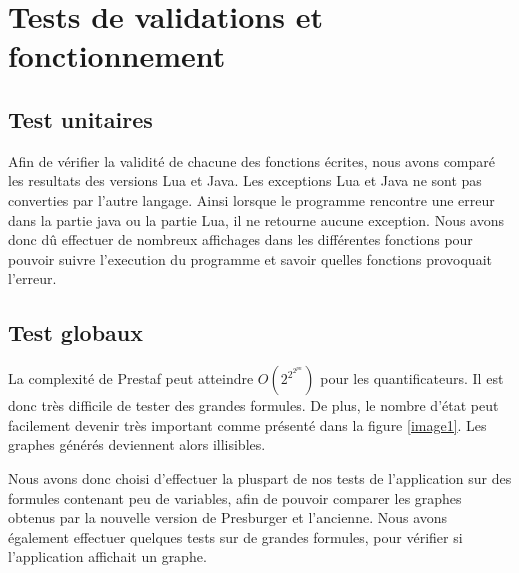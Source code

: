 \section{Tests de validations et fonctionnement}

\subsection{Test unitaires}

Afin de vérifier la validité de chacune des fonctions écrites, nous avons comparé les resultats des versions Lua et Java. Les exceptions Lua et Java ne sont pas converties par l'autre langage. Ainsi lorsque le programme rencontre une erreur dans la partie java ou la partie Lua, il ne retourne aucune exception. Nous avons donc dû effectuer de nombreux affichages dans les différentes fonctions pour pouvoir suivre l'execution du programme et savoir quelles fonctions provoquait l'erreur. 

\subsection{Test globaux}

La complexité de Prestaf peut atteindre $O(2^{2^{2^{pn}}})$ pour les quantificateurs. Il est donc très difficile de tester des grandes formules. De plus, le nombre d'état peut facilement devenir très important comme présenté dans la figure \ref{image1}. Les graphes générés deviennent alors illisibles.\par

Nous avons donc choisi d'effectuer la pluspart de nos tests de l'application sur des formules contenant peu de variables, afin de pouvoir comparer les graphes obtenus par la nouvelle version de Presburger et l'ancienne. Nous avons également effectuer quelques tests sur de grandes formules, pour vérifier si l'application affichait un graphe.\clearpage


